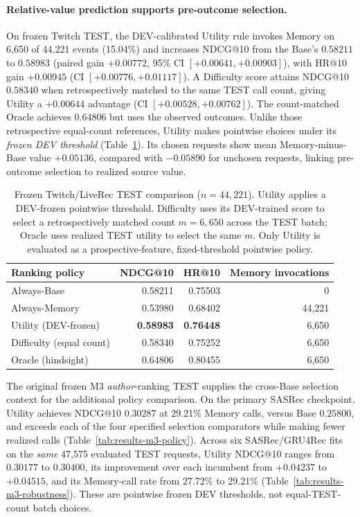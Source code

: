 \paragraph{Relative-value prediction supports pre-outcome selection.}
On frozen Twitch TEST, the DEV-calibrated Utility rule invokes Memory on 6,650 of 44,221 events (15.04\%) and increases NDCG@10 from the Base's $0.58211$ to $0.58983$ (paired gain $+0.00772$, 95\% CI $[+0.00641,+0.00903]$), with HR@10 gain $+0.00945$ (CI $[+0.00776,+0.01117]$). A Difficulty score attains NDCG@10 $0.58340$ when retrospectively matched to the same TEST call count, giving Utility a $+0.00644$ advantage (CI $[+0.00528,+0.00762]$). The count-matched Oracle achieves $0.64806$ but uses the observed outcomes. Unlike those retrospective equal-count references, Utility makes pointwise choices under its \emph{frozen DEV threshold} (Table~\ref{tab:results-twitch-policy}). Its chosen requests show mean Memory-minus-Base value $+0.05136$, compared with $-0.05890$ for unchosen requests, linking pre-outcome selection to realized source value.

\begin{table}[!h]
\centering
\caption{Frozen Twitch/LiveRec TEST comparison ($n=44{,}221$). Utility applies a DEV-frozen pointwise threshold. Difficulty uses its DEV-trained score to select a retrospectively matched count $m=6{,}650$ across the TEST batch; Oracle uses realized TEST utility to select the same $m$. Only Utility is evaluated as a prospective-feature, fixed-threshold pointwise policy.}
\label{tab:results-twitch-policy}
\footnotesize
\setlength{\tabcolsep}{6pt}
\begin{tabular}{@{}lrrr@{}}
\toprule
Ranking policy & NDCG@10 & HR@10 & Memory invocations \\
\midrule
Always-Base & 0.58211 & 0.75503 & 0 \\
Always-Memory & 0.53980 & 0.68402 & 44,221 \\
Utility (DEV-frozen) & \textbf{0.58983} & \textbf{0.76448} & 6,650 \\
Difficulty (equal count) & 0.58340 & 0.75252 & 6,650 \\
Oracle (hindsight) & 0.64806 & 0.80455 & 6,650 \\
\bottomrule
\end{tabular}
\end{table}

The original frozen M3 \emph{author}-ranking TEST supplies the cross-Base selection context for the additional policy comparison. On the primary SASRec checkpoint, Utility achieves NDCG@10 $0.30287$ at 29.21\% Memory calls, versus Base $0.25800$, and exceeds each of the four specified selection comparators while making fewer realized calls (Table~\ref{tab:results-m3-policy}). Across six SASRec/GRU4Rec fits on the \emph{same} 47,575 evaluated TEST requests, Utility NDCG@10 ranges from $0.30177$ to $0.30400$, its improvement over each incumbent from $+0.04237$ to $+0.04515$, and its Memory-call rate from 27.72\% to 29.21\% (Table~\ref{tab:results-m3-robustness}). These are pointwise frozen DEV thresholds, not equal-TEST-count batch choices.

